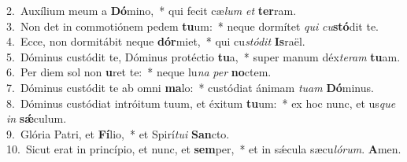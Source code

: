 {2.~}Auxílium meum a \textbf{Dó}mino,~* qui fecit cæ\textit{lum} \textit{et} \textbf{ter}ram.\\
{3.~}Non det in commotiónem pedem \textbf{tu}um:~* neque dormítet \textit{qui} \textit{cu}\textbf{stó}dit te.\\
{4.~}Ecce, non dormitábit neque \textbf{dór}miet,~* qui cu\textit{stó}\textit{dit} \textbf{Is}raël.\\
{5.~}Dóminus custódit te, Dóminus protéctio \textbf{tu}a,~* super manum déx\textit{te}\textit{ram} \textbf{tu}am.\\
{6.~}Per diem sol non \textbf{u}ret te:~* neque lu\textit{na} \textit{per} \textbf{no}ctem.\\
{7.~}Dóminus custódit te ab omni \textbf{ma}lo:~* custódiat ánimam \textit{tu}\textit{am} \textbf{Dó}minus.\\
{8.~}Dóminus custódiat intróitum tuum, et éxitum \textbf{tu}um:~* ex hoc nunc, et us\textit{que} \textit{in} \textbf{sǽ}culum.\\
{9.~}Glória Patri, et \textbf{Fí}lio,~* et Spirí\textit{tu}\textit{i} \textbf{San}cto.\\
{10.~}Sicut erat in princípio, et nunc, et \textbf{sem}per,~* et in sǽcula sæcu\textit{ló}\textit{rum}. \textbf{A}men.\\
